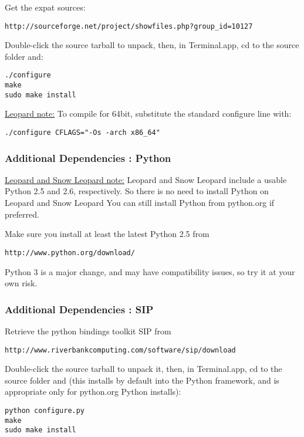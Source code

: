 Get the expat sources:

\begin{verbatim}
http://sourceforge.net/project/showfiles.php?group_id=10127 
\end{verbatim}

Double-click the source tarball to unpack, then, in Terminal.app, cd to the source folder and:

\begin{verbatim}
./configure
make 
sudo make install 
\end{verbatim}

\underline{Leopard note:} To compile for 64bit, substitute the standard configure line with:

\begin{verbatim}
./configure CFLAGS="-Os -arch x86_64"
\end{verbatim}

\subsubsection{Additional Dependencies : Python}
\underline{Leopard and Snow Leopard note:} Leopard and Snow Leopard include a usable
Python 2.5 and 2.6, respectively. So there is no need to install Python on
Leopard and Snow Leopard You can still install Python from python.org if preferred.

Make sure you install at least the latest Python 2.5 from 

\begin{verbatim}
http://www.python.org/download/
\end{verbatim}

Python 3 is a major change, and may have compatibility issues, so try it at your own risk.

\subsubsection{Additional Dependencies : SIP}
Retrieve the python bindings toolkit SIP from

\begin{verbatim}
http://www.riverbankcomputing.com/software/sip/download
\end{verbatim}

Double-click the source tarball to unpack it, then, in Terminal.app, cd to the source folder
and (this installs by default into the Python framework, and is appropriate only for python.org Python installs):

\begin{verbatim}
python configure.py 
make 
sudo make install 
\end{verbatim}

